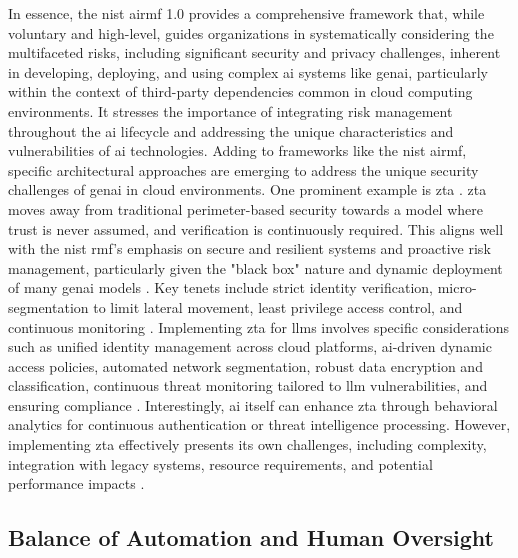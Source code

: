 In essence, the \gls{nist} \gls{airmf} 1.0 provides a comprehensive framework that, while voluntary and high-level, guides organizations in systematically considering the multifaceted risks, including significant security and privacy challenges, inherent in developing, deploying, and using complex \gls{ai} systems like \gls{genai}, particularly within the context of third-party dependencies common in cloud computing environments. It stresses the importance of integrating risk management throughout the \gls{ai} lifecycle and addressing the unique characteristics and vulnerabilities of \gls{ai} technologies.
Adding to frameworks like the \gls{nist} \gls{airmf}, specific architectural approaches are emerging to address the unique security challenges of \gls{genai} in cloud environments. One prominent example is \gls{zta} \cite{dash_zero-trust_2024}. \gls{zta} moves away from traditional perimeter-based security towards a model where trust is never assumed, and verification is continuously required\cite{dash_zero-trust_2024}. This aligns well with the \gls{nist} \gls{rmf}'s emphasis on secure and resilient systems and proactive risk management, particularly given the "black box" nature and dynamic deployment of many \gls{genai} models \cite{dash_zero-trust_2024, tabassi_artificial_2023}. Key tenets include strict identity verification, micro-segmentation to limit lateral movement, least privilege access control, and continuous monitoring \cite{dash_zero-trust_2024}. Implementing \gls{zta} for \glspl{llm} involves specific considerations such as unified identity management across cloud platforms, \gls{ai}-driven dynamic access policies, automated network segmentation, robust data encryption and classification, continuous threat monitoring tailored to \gls{llm} vulnerabilities, and ensuring compliance \cite{dash_zero-trust_2024}. Interestingly, \gls{ai} itself can enhance \gls{zta} through behavioral analytics for continuous authentication or threat intelligence processing\cite{dash_zero-trust_2024}. However, implementing \gls{zta} effectively presents its own challenges, including complexity, integration with legacy systems, resource requirements, and potential performance impacts \cite{dash_zero-trust_2024}.

\subsection{Balance of Automation and Human Oversight} %
\label{sec:Balance of Automation and Human Oversight}

